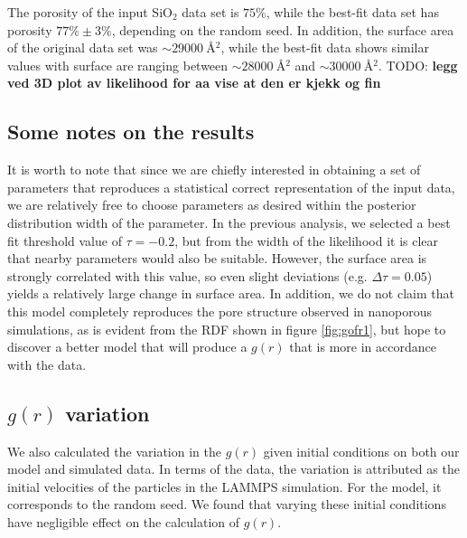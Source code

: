 \documentclass[aps,pre,twocolumn,letterpaper,floatfix,showpacs]{revtex4}
\newcommand{\todo}[1]{ {\color{Magenta} TODO: \color{Blue} \textbf{#1} }}
\begin{document}
The porosity of the input SiO$_2$ data set is $75\%$, while the best-fit data set has porosity $77\% \pm 3 \%$, depending on the random seed. In addition, the surface area of the original data set was $\sim \SI{29000}{\angstrom^2}$, while the best-fit data shows similar values with surface are ranging between $\sim \SI{28000}{\angstrom^2}$ and $\sim \SI{30000}{\angstrom^2}$.
\todo{legg ved 3D plot av likelihood for aa vise at den er kjekk og fin}

\subsection{Some notes on the results}
It is worth to note that since we are chiefly interested in obtaining a set of parameters that reproduces a statistical correct representation of the input data, we are relatively free to choose parameters as desired within the posterior distribution width of the parameter. In the previous analysis, we selected a best fit threshold value of $\tau=-0.2$, but from the width of the likelihood it is clear that nearby parameters would also be suitable. However, the surface area is strongly correlated with this value, so even slight deviations (e.g. $\Delta \tau = 0.05$) yields a relatively large change in surface area. In addition, we do not claim that this model completely reproduces the pore structure observed in nanoporous simulations, as is evident from the RDF shown in figure \ref{fig:gofr1}, but hope to discover a better model that will produce a $g(r)$ that is more in accordance with the data.

\subsection{$g(r)$ variation}
We also calculated the variation in the $g(r)$ given initial conditions on both our model and simulated data. In terms of the data, the variation is attributed as the initial velocities of the particles in the LAMMPS simulation. For the model, it corresponds to the random seed. We found that varying these initial conditions have negligible effect on the calculation of $g(r)$.
\end{document}
